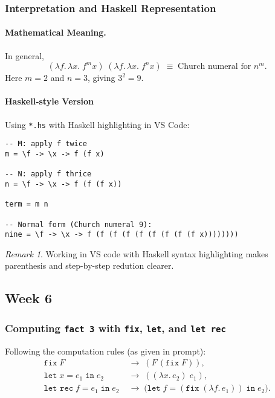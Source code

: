 \documentclass{article}
\theoremstyle{theorem}
\theoremstyle{definition}
\theoremstyle{remark}
\newtheorem{remark}[theorem]{Remark}
\begin{document}
\subsubsection{Interpretation and Haskell Representation}
\paragraph{Mathematical Meaning.}
In general,
\[
(\lambda f.\,\lambda x.\; f^m x)\;(\lambda f.\,\lambda x.\; f^n x)
\;\equiv\; \text{Church numeral for } n^m.
\]
Here $m=2$ and $n=3$, giving $3^2 = 9$.

\paragraph{Haskell-style Version}
Using \texttt{*.hs} with Haskell highlighting in VS Code:
\begin{lstlisting}
-- M: apply f twice
m = \f -> \x -> f (f x)

-- N: apply f thrice
n = \f -> \x -> f (f (f x))

term = m n

-- Normal form (Church numeral 9):
nine = \f -> \x -> f (f (f (f (f (f (f (f (f x))))))))
\end{lstlisting}

\begin{remark}
  Working in VS code with Haskell syntax highlighting makes parenthesis and step-by-step redution clearer.
\end{remark}

\subsection{Week 6}

\subsubsection{Computing \texttt{fact 3} with \texttt{fix}, \texttt{let}, and \texttt{let rec}}

Following the computation rules (as given in prompt):
\[
\begin{aligned}
\texttt{fix}\;F &\;\to\; (F\,(\texttt{fix}\;F)),\\
\texttt{let}\;x = e_1\;\texttt{in}\;e_2 &\;\to\; ((\lambda x.\,e_2)\;e_1),\\
\texttt{let rec}\;f = e_1\;\texttt{in}\;e_2 &\;\to\; \bigl(\texttt{let}\;f = (\texttt{fix}\;(\lambda f.\,e_1))\;\texttt{in}\;e_2\bigr).
\end{aligned}
\]
\end{document}
